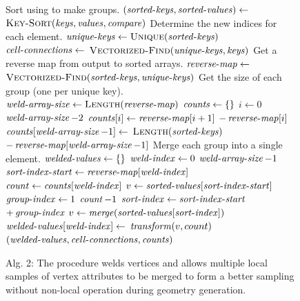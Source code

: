 \documentclass[10pt,journal,cspaper,compsoc]{IEEEtran}
\begin{document}
\noindent
\begin{figure}
\vspace{-.32cm}
\begin{codebox}
  \zi \Comment Sort  using  to make groups.
  \li $(\id{sorted-keys},\id{sorted-values}) \gets$
  \zi \> $\proc{Key-Sort}(\id{keys},\id{values},\id{compare})$
  \zi \Comment Determine the new indices for each element.
  \li $\id{unique-keys} \gets \proc{Unique}(\id{sorted-keys})$
  \li $\id{cell-connections} \gets$
  \zi \> $\proc{Vectorized-Find}(\id{unique-keys},\id{keys})$
  \zi \Comment Get a reverse map from output to sorted arrays.
  \li $\id{reverse-map} \gets$
  \zi \> $\proc{Vectorized-Find}(\id{sorted-keys},\id{unique-keys})$
  \zi \Comment Get the size of each group (one per unique key).
  \li $\id{weld-array-size} \gets \proc{Length}(\id{reverse-map})$
  \li $\id{counts} \gets \{ \}$
  \li \For $i \gets 0$ \To $\id{weld-array-size} - 2$
  \zi \Do {}
  \li     $\id{counts}[i] \gets \id{reverse-map}[i+1]$
  \zi \>\>\>\> $- \id{reverse-map}[i]$
      \End
  \li $\id{counts}[\id{weld-array-size}-1] \gets$
  \zi \> $\proc{Length}(\id{sorted-keys})$
  \zi \>\>\> $ - \id{reverse-map}[\id{weld-array-size}-1]$
  \zi \Comment Merge each group into a single element.
  \li $\id{welded-values} \gets \{ \}$
  \li \For $\id{weld-index} \gets 0$ \To $\id{weld-array-size} - 1$
  \zi \Do {}
  \li     $\id{sort-index-start} \gets \id{reverse-map}[\id{weld-index}]$
  \li     $\id{count} \gets \id{counts}[\id{weld-index}]$
  \li     $v \gets \id{sorted-values}[\id{sort-index-start}]$
  \li     \For $\id{group-index} \gets 1$ \To $\id{count} - 1$
  \zi     \Do
  \li         $\id{sort-index} \gets \id{sort-index-start}$
  \zi         \>\>\>\> $+ \id{group-index}$
  \li         $v \gets \id{merge}(\id{sorted-values}[\id{sort-index}])$
          \End
  \li     $\id{welded-values}[\id{weld-index}] \gets$
  \zi     \>\>\>\> $\id{transform}(v, count)$
      \End
  \li \Return $(\id{welded-values}, \id{cell-connections}, \id{counts})$
\end{codebox}
\vspace{-0.47cm}
\caption*{Alg. 2: The  procedure welds vertices and allows multiple local samples of vertex attributes to be merged to form a better sampling without non-local operation during geometry generation.}
\end{figure}
\end{document}
